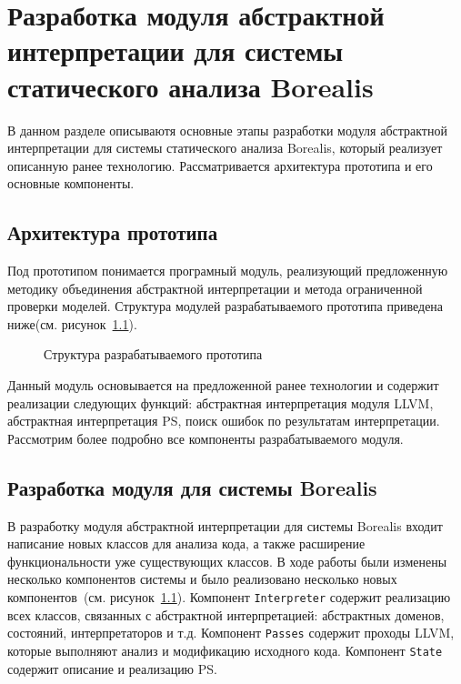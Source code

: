 \chapter{Разработка модуля абстрактной интерпретации для системы статического
анализа Borealis}
\label{chapter:implementation}
В данном разделе описываютя основные этапы разработки модуля абстрактной 
интерпретации для системы статического анализа Borealis, который реализует
описанную ранее технологию. Рассматривается архитектура прототипа и его
основные компоненты.

\section{Архитектура прототипа}
Под прототипом понимается програмный модуль, реализующий предложенную методику
объединения абстрактной интерпретации и метода ограниченной проверки моделей.
Структура модулей разрабатываемого прототипа приведена ниже(см. 
рисунок~\ref{image:prototypeArchitecture}).
\begin{figure}[h!]
\caption{Структура разрабатываемого прототипа}
\label{image:prototypeArchitecture}
\end{figure}

Данный модуль основывается на предложенной ранее технологии и содержит реализации
следующих функций: абстрактная интерпретация модуля LLVM, абстрактная 
интерпретация PS, поиск ошибок по результатам интерпретации. Рассмотрим более
подробно все компоненты разрабатываемого модуля.

\section{Разработка модуля для системы Borealis}
В разработку модуля абстрактной интерпретации для системы Borealis входит 
написание новых классов для анализа кода, а также расширение функциональности 
уже существующих классов. В ходе работы были изменены несколько компонентов 
системы и было реализовано несколько новых компонентов~(см. 
рисунок~\ref{image:prototypeArchitecture}). Компонент \texttt{Interpreter}
содержит реализацию всех классов, связанных с абстрактной интерпретацией:
абстрактных доменов, состояний, интерпретаторов и  т.д. Компонент \texttt{Passes}
содержит проходы LLVM, которые выполняют анализ и модификацию исходного кода.
Компонент \texttt{State} содержит описание и реализацию PS.

